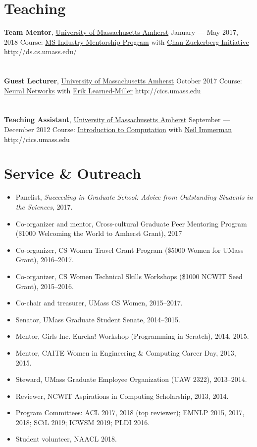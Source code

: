 \documentclass{resume}
\begin{document}
\section{Teaching}
\employer
   {\textbf{Team Mentor}, \href{http://cics.umass.edu}{University of Massachusetts Amherst}}
   {January --- May 2017, 2018}
   {Course: \href{http://ds.cs.umass.edu/industry-mentorship-program}{MS Industry Mentorship Program} with \href{https://www.chanzuckerberg.com/science/projects-meta}{Chan Zuckerberg Initiative}} {http://ds.cs.umass.edu/}
\\ \\ \\
\employer
    {\textbf{Guest Lecturer}, \href{http://cics.umass.edu}{University of Massachusetts Amherst}}
    {October 2017}
    {Course: \href{https://compsci682.github.io/syllabus.html}{Neural Networks} with \href{http://cs.umass.edu/~elm}{Erik Learned-Miller}} {http://cics.umass.edu}
\\ \\ \\ 
\employer
    {\textbf{Teaching Assistant}, \href{http://cics.umass.edu}{University of Massachusetts Amherst}}
    {September --- December 2012}
    {Course: \href{https://people.cs.umass.edu/~immerman/cs250/syllabus.html}{Introduction to Computation} with \href{http://cs.umass.edu/~immerman}{Neil Immerman}} {http://cics.umass.edu}


\section{Service \& Outreach}
\begin{itemize}
\item Panelist, \emph{Succeeding in Graduate School: Advice from Outstanding Students in the Sciences}, 2017. 
\item Co-organizer and mentor, Cross-cultural Graduate Peer Mentoring Program (\$1000 Welcoming the World to Amherst Grant), 2017
\item Co-organizer, CS Women Travel Grant Program (\$5000 Women for UMass Grant), 2016--2017.
\item Co-organizer, CS Women Technical Skills Workshops (\$1000 NCWIT Seed Grant), 2015--2016.
\item Co-chair and treasurer, UMass CS Women, 2015--2017.
\item Senator, UMass Graduate Student Senate, 2014--2015.
\item Mentor, Girls Inc. Eureka! Workshop (Programming in Scratch), 2014, 2015.
\item Mentor, CAITE Women in Engineering \& Computing Career Day, 2013, 2015.
\item Steward, UMass Graduate Employee Organization (UAW 2322), 2013--2014.
\item Reviewer, NCWIT Aspirations in Computing Scholarship, 2013, 2014.
\item Program Committees: ACL 2017, 2018 (top reviewer); EMNLP 2015, 2017, 2018; SCiL 2019; ICWSM 2019; PLDI 2016.
\item Student volunteer, NAACL 2018.
\end{itemize}
\end{document}
